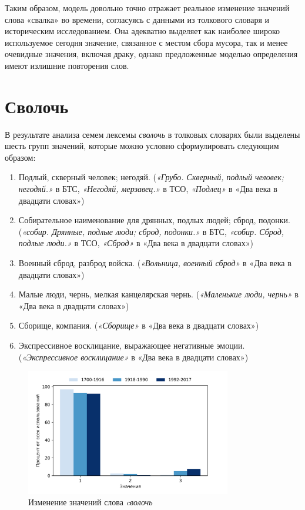 Таким образом, модель довольно точно отражает реальное изменение значений слова «свалка»
во времени, согласуясь с данными из толкового словаря и историческим исследованием.
Она адекватно выделяет как наиболее широко используемое сегодня значение,
связанное с местом сбора мусора,
так и менее очевидные значения, включая драку,
однако предложенные моделью определения имеют излишние повторения слов.

\section*{Сволочь}

В результате анализа семем лексемы \textit{сволочь} в толковых словарях были выделены шесть групп значений,
которые можно условно сформулировать следующим образом:

\begin{enumerate}
    \item Подлый, скверный человек; негодяй.
(\textit{«Грубо. Скверный, подлый человек; негодяй.»} в БТС,
\textit{«Негодяй, мерзавец.»} в ТСО,
\textit{«Подлец»} в «Два века в двадцати словах»)
    \item Собирательное наименование для дрянных, подлых людей; сброд, подонки.
(\textit{«собир. Дрянные, подлые люди; сброд, подонки.»} в БТС,
\textit{«собир. Сброд, подлые люди.»} в ТСО,
\textit{«Сброд»} в «Два века в двадцати словах»)
    \item Военный сброд, разброд войска.
(\textit{«Вольница, военный сброд»} в «Два века в двадцати словах»)
    \item Малые люди, чернь, мелкая канцелярская чернь.
(\textit{«Маленькие люди, чернь»} в «Два века в двадцати словах»)
    \item Сборище, компания.
(\textit{«Сборище»} в «Два века в двадцати словах»)
    \item Экспрессивное восклицание, выражающее негативные эмоции.
(\textit{«Экспрессивное восклицание»} в «Два века в двадцати словах»)
\end{enumerate}

\begin{figure}[H]
	\centering
	\includegraphics[width=0.8\textwidth]{img/visualizations/svoloch'_minimal}
	\caption{Изменение значений слова \textit{cволочь}}
	\label{fig:Сволочь}
\end{figure}

